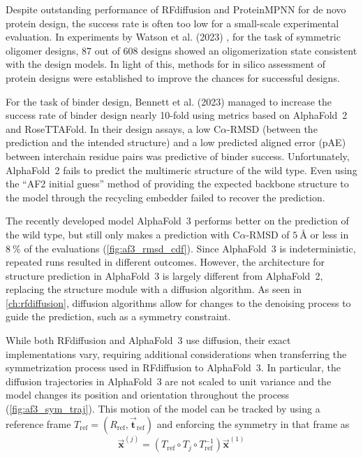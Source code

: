 Despite outstanding performance of RFdiffusion and ProteinMPNN for de novo protein design, the success rate is often too low for a small-scale experimental evaluation. In experiments by Watson et al. (2023) \cite{RFdiffusion}, for the task of symmetric oligomer designs, 87 out of 608 designs showed an oligomerization state consistent with the design models. In light of this, methods for in silico assessment of protein designs were established to improve the chances for successful designs. 

For the task of binder design, Bennett et al. (2023) \cite{binder_design} managed to increase the success rate of binder design nearly 10-fold using metrics based on AlphaFold~2 and RoseTTAFold. In their design assays, a low C$\alpha$-RMSD (between the prediction and the intended structure) and a low predicted aligned error (pAE) between interchain residue pairs was predictive of binder success. Unfortunately, AlphaFold~2 fails to predict the multimeric structure of the wild type. Even using the ``AF2 initial guess'' method \cite{binder_design} of providing the expected backbone structure to the model through the recycling embedder failed to recover the prediction. 

The recently developed model AlphaFold~3 \cite{af3} performs better on the prediction of the wild type, but still only makes a prediction with C$\alpha$-RMSD of $\SI{5}{\angstrom}$ or less in $\SI{8}{\percent}$ of the evaluations (\autoref{fig:af3_rmsd_cdf}). Since AlphaFold~3 is indeterministic, repeated runs  resulted in different outcomes. However, the architecture for structure prediction in AlphaFold~3 is largely different from AlphaFold~2, replacing the structure module with a diffusion algorithm. As seen in \autoref{ch:rfdiffusion}, diffusion algorithms allow for changes to the denoising process to guide the prediction, such as a symmetry constraint. 

While both RFdiffusion and AlphaFold~3 use diffusion, their exact implementations vary, requiring additional considerations when transferring the symmetrization process used in RFdiffusion to AlphaFold~3. In particular, the diffusion trajectories in AlphaFold~3 are not scaled to unit variance and the model changes its position and orientation throughout the process (\autoref{fig:af3_sym_traj}). This motion of the model can be tracked by using a reference frame $T_{\text{ref}} = (R_{\text{ref}}, \vec{\mathbf{t}}_{\text{ref}})$ and enforcing the symmetry in that frame as 
\begin{equation}
\vec{\mathbf{x}}^{(j)} = \left(T_{\text{ref}} \circ T_j \circ T_{\text{ref}}^{-1} \right) \vec{\mathbf{x}}^{(1)}
\end{equation}

